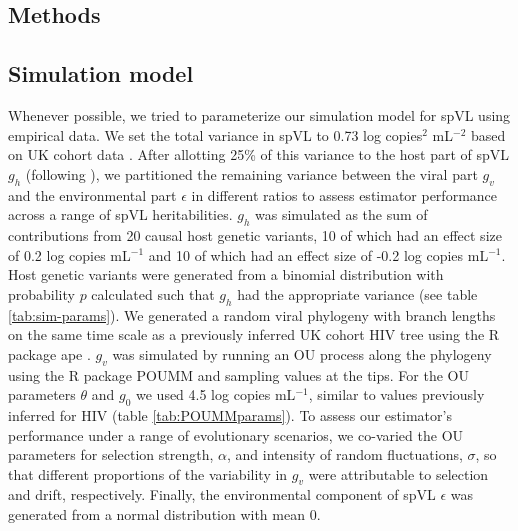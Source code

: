 \documentclass[]{article}
\begin{document}
\begin{doublespace}
\section{Methods}

\subsection{Simulation model}

Whenever possible, we tried to parameterize our simulation model for spVL using empirical data. We set the total variance in spVL to 0.73 log copies$^2$ mL$^{-2}$ based on UK cohort data \parencite{Mitov2018}. After allotting 25\% of this variance to the host part of spVL $g_h$ (following \citealt{McLaren2015}), we partitioned the remaining variance between the viral part $g_v$ and the environmental part $\epsilon$ in different ratios to assess estimator performance across a range of spVL heritabilities. $g_h$ was simulated as the sum of contributions from 20 causal host genetic variants, 10 of which had an effect size of 0.2 log copies mL$^{-1}$ and 10 of which had an effect size of -0.2 log copies mL$^{-1}$. Host genetic variants were generated from a binomial distribution with probability $p$ calculated such that $g_h$ had the appropriate variance (see table \ref{tab:sim-params}). We generated a random viral phylogeny with branch lengths on the same time scale as a previously inferred UK cohort HIV tree \parencite{Hodcroft2014} using the R package ape \parencite{Paradis2018}. $g_v$ was simulated by running an OU process along the phylogeny using the R package POUMM \parencite{Mitov2017a-POUMM} and sampling values at the tips. For the OU parameters $\theta$ and $g_{0}$ we used 4.5 log copies mL$^{-1}$, similar to values previously inferred for HIV (table \ref{tab:POUMMparams}). To assess our estimator's performance under a range of evolutionary scenarios, we co-varied the OU parameters for selection strength, $\alpha$, and intensity of random fluctuations, $\sigma$, so that different proportions of the variability in $g_v$ were attributable to selection and drift, respectively. Finally, the environmental component of spVL $\epsilon$ was generated from a normal distribution with mean 0.

\begin{figure}[H]
	\begin{tikzpicture}
	

\end{tikzpicture}
\end{figure}
\end{doublespace}
\end{document}
